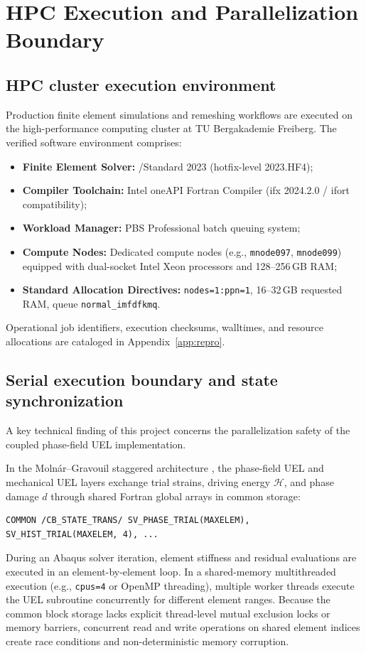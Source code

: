\chapter{HPC Execution and Parallelization Boundary}
\label{ch:hpc}

\section{HPC cluster execution environment}
Production finite element simulations and remeshing workflows are executed on the high-performance computing cluster at TU Bergakademie Freiberg. The verified software environment comprises:
\begin{itemize}
  \item \textbf{Finite Element Solver:} \Abaqus/Standard 2023 (hotfix-level 2023.HF4);
  \item \textbf{Compiler Toolchain:} Intel oneAPI Fortran Compiler (ifx 2024.2.0 / ifort compatibility);
  \item \textbf{Workload Manager:} PBS Professional batch queuing system;
  \item \textbf{Compute Nodes:} Dedicated compute nodes (e.g., \texttt{mnode097}, \texttt{mnode099}) equipped with dual-socket Intel Xeon processors and 128--256\,GB RAM;
  \item \textbf{Standard Allocation Directives:} \texttt{nodes=1:ppn=1}, 16--32\,GB requested RAM, queue \texttt{normal\_imfdfkmq}.
\end{itemize}

Operational job identifiers, execution checksums, walltimes, and resource allocations are cataloged in Appendix~\ref{app:repro}.

\section{Serial execution boundary and state synchronization}
A key technical finding of this project concerns the parallelization safety of the coupled phase-field UEL implementation.

In the Moln\'ar--Gravouil staggered architecture \citep{Molnar2017}, the phase-field UEL and mechanical UEL layers exchange trial strains, driving energy $\mathcal{H}$, and phase damage $d$ through shared Fortran global arrays in common storage:
\begin{verbatim}
COMMON /CB_STATE_TRANS/ SV_PHASE_TRIAL(MAXELEM), SV_HIST_TRIAL(MAXELEM, 4), ...
\end{verbatim}
During an Abaqus solver iteration, element stiffness and residual evaluations are executed in an element-by-element loop. In a shared-memory multithreaded execution (e.g., \texttt{cpus=4} or OpenMP threading), multiple worker threads execute the UEL subroutine concurrently for different element ranges. Because the common block storage lacks explicit thread-level mutual exclusion locks or memory barriers, concurrent read and write operations on shared element indices create race conditions and non-deterministic memory corruption.


